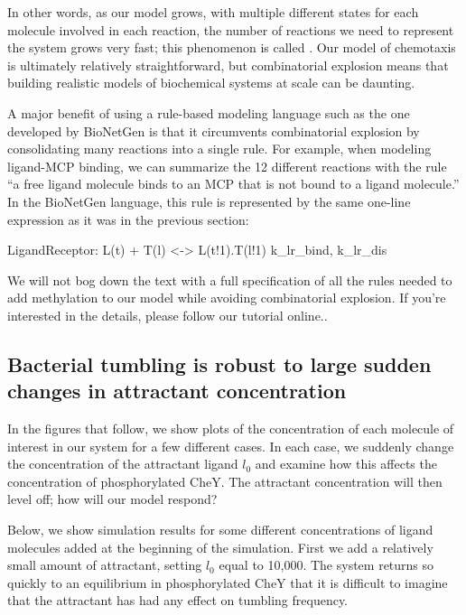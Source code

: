 In other words, as our model grows, with multiple different states for each molecule involved in each reaction, the number of reactions we need to represent the system grows very fast; this phenomenon is called . Our model of chemotaxis is ultimately relatively straightforward, but combinatorial explosion means that building realistic models of biochemical systems at scale can be daunting.

A major benefit of using a rule-based modeling language such as the one developed by BioNetGen is that it circumvents combinatorial explosion by consolidating many reactions into a single rule. For example, when modeling ligand-MCP binding, we can summarize the 12 different reactions with the rule ``a free ligand molecule binds to an MCP that is not bound to a ligand molecule.'' In the BioNetGen language, this rule is represented by the same one-line expression as it was in the previous section:\\

\begin{BioNetGen}
LigandReceptor: L(t) + T(l) <-> L(t!1).T(l!1) k\_lr\_bind, k\_lr\_dis
\end{BioNetGen}

We will not bog down the text with a full specification of all the rules needed to add methylation to our model while avoiding combinatorial explosion. If you're interested in the details, please follow our tutorial online..


\FloatBarrier
{}
\subsection{Bacterial tumbling is robust to large sudden changes in attractant concentration}

In the figures that follow, we show plots of the concentration of each molecule of interest in our system for a few different cases. In each case, we suddenly change the concentration of the attractant ligand $l_0$ and examine how this affects the concentration of phosphorylated CheY. The attractant concentration will then level off; how will our model respond?

Below, we show simulation results for some different concentrations of ligand molecules added at the beginning of the simulation. First we add a relatively small amount of attractant, setting $l_0$ equal to 10,000. The system returns so quickly to an equilibrium in phosphorylated CheY that it is difficult to imagine that the attractant has had any effect on tumbling frequency.

